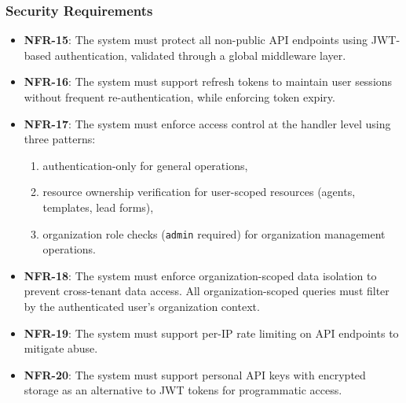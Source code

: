 \subsubsection{Security Requirements}
\begin{itemize}
    \item \textbf{NFR-15}: The system must protect all non-public API endpoints using JWT-based authentication, validated through a global middleware layer.
    \item \textbf{NFR-16}: The system must support refresh tokens to maintain user sessions without frequent re-authentication, while enforcing token expiry.
    \item \textbf{NFR-17}: The system must enforce access control at the handler level using three patterns:
    \begin{enumerate}
        \item[(a)] authentication-only for general operations,
        \item[(b)] resource ownership verification for user-scoped resources (agents, templates, lead forms),
        \item[(c)] organization role checks (\texttt{admin} required) for organization management operations.
    \end{enumerate}
    \item \textbf{NFR-18}: The system must enforce organization-scoped data isolation to prevent cross-tenant data access. All organization-scoped queries must filter by the authenticated user's organization context.
    \item \textbf{NFR-19}: The system must support per-IP rate limiting on API endpoints to mitigate abuse.
    \item \textbf{NFR-20}: The system must support personal API keys with encrypted storage as an alternative to JWT tokens for programmatic access.
\end{itemize}
